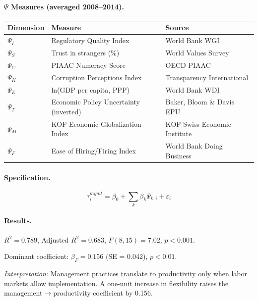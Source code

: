 \paragraph{$\Psi$ Measures (averaged 2008--2014).}
\begin{center}
\small
\begin{tabular}{@{}lll@{}}
\toprule
\textbf{Dimension} & \textbf{Measure} & \textbf{Source} \\
\midrule
$\Psi_I$ & Regulatory Quality Index & World Bank WGI \\
$\Psi_S$ & Trust in strangers (\%) & World Values Survey \\
$\Psi_C$ & PIAAC Numeracy Score & OECD PIAAC \\
$\Psi_K$ & Corruption Perceptions Index & Transparency International \\
$\Psi_E$ & ln(GDP per capita, PPP) & World Bank WDI \\
$\Psi_T$ & Economic Policy Uncertainty (inverted) & Baker, Bloom \& Davis EPU \\
$\Psi_M$ & KOF Economic Globalization Index & KOF Swiss Economic Institute \\
$\Psi_F$ & Ease of Hiring/Firing Index & World Bank Doing Business \\
\bottomrule
\end{tabular}
\end{center}

\paragraph{Specification.}
\begin{equation}
\tau_i^{mgmt} = \beta_0 + \sum_{k} \beta_k \Psi_{k,i} + \varepsilon_i
\end{equation}

\paragraph{Results.}
$R^2 = 0.789$, Adjusted $R^2 = 0.683$, $F(8,15) = 7.02$, $p < 0.001$.

Dominant coefficient: $\beta_F = 0.156$ (SE = 0.042), $p < 0.01$.

\textit{Interpretation:} Management practices translate to productivity only when labor markets allow implementation. A one-unit increase in flexibility raises the management$\rightarrow$productivity coefficient by 0.156.

